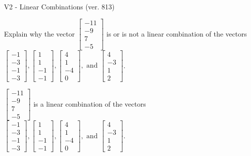 \begin{exercise}
  \begin{exerciseTitle}V2 - Linear Combinations (ver. 813)\end{exerciseTitle}
  \begin{exerciseStatement}
    Explain why the vector \(\left[\begin{array}{c}
-11 \\
-9 \\
7 \\
-5
\end{array}\right]\)  is or is not a linear 
	combination of the vectors \(\left[\begin{array}{c}
-1 \\
-3 \\
-1 \\
-3
\end{array}\right] , \left[\begin{array}{c}
1 \\
1 \\
-1 \\
-1
\end{array}\right] , \left[\begin{array}{c}
4 \\
1 \\
-4 \\
0
\end{array}\right] , \text{ and } \left[\begin{array}{c}
4 \\
-3 \\
1 \\
2
\end{array}\right]\).
	


  \end{exerciseStatement}
  \begin{exerciseAnswer}
   \(\left[\begin{array}{c}
-11 \\
-9 \\
7 \\
-5
\end{array}\right]\) 
  	 is  
	a linear combination of the vectors \(\left[\begin{array}{c}
-1 \\
-3 \\
-1 \\
-3
\end{array}\right] , \left[\begin{array}{c}
1 \\
1 \\
-1 \\
-1
\end{array}\right] , \left[\begin{array}{c}
4 \\
1 \\
-4 \\
0
\end{array}\right] , \text{ and } \left[\begin{array}{c}
4 \\
-3 \\
1 \\
2
\end{array}\right]\).


\end{exerciseAnswer}
\end{exercise}
